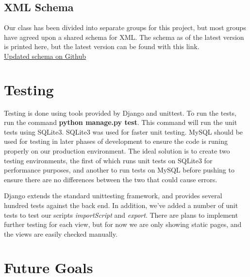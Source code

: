 \documentclass[12pt]{report}
\begin{document}
\subsection*{XML Schema}
\hfill


Our class has been divided into separate groups for this project, but most groups have agreed upon a shared schema for XML.
The schema as of the latest version is printed here, but the latest version can be found with this link.\\


\href{https://github.com/aaronj1335/cs373-wcdb1-schema/blob/master/WorldCrises.xsd.xml}{Updated schema on Github}\\
\section*{Testing}
\hfill


Testing is done using tools provided by Django and unittest.
To run the tests, run the command \textbf{python manage.py test}.
This command will run the unit tests using SQLite3.
SQLite3 was used for faster unit testing.
MySQL should be used for testing in later phases of development to ensure the code is runing properly on our production environment.
The ideal solution is to create two testing environments, the first of which runs unit tests on SQLite3 for performance purposes,
and another to run tests on MySQL before pushing to ensure there are no differences between the two that could cause errors.


Django extends the standard unittesting framework, and provides several hundred tests against the back end.
In addition, we've added a number of unit tests to test our scripts \emph{importScript} and \emph{export}.
There are plans to implement further testing for each view, but for now we are only showing static pages,
and the views are easily checked manually.



\newpage
\section*{Future Goals}
\end{document}

